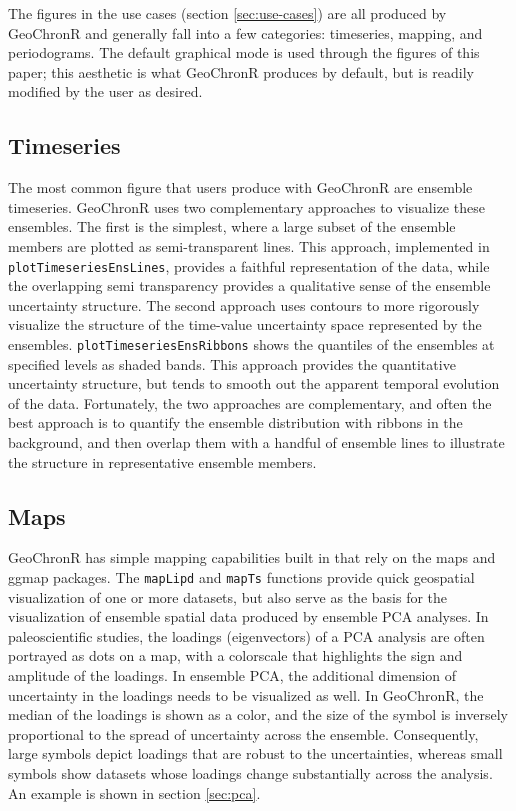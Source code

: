 \documentclass[gchron, manuscript]{copernicus}
\begin{document}
The figures in the use cases (section \ref{sec:use-cases}) are all produced by GeoChronR and generally fall into a few categories: timeseries, mapping, and periodograms.
The default graphical mode is used through the figures of this paper; this aesthetic is what GeoChronR produces by default, but is readily modified by the user as desired.

\subsection{Timeseries}

The most common figure that users produce with GeoChronR are ensemble timeseries.
GeoChronR uses two complementary approaches to visualize these ensembles.
The first is the simplest, where a large subset of the ensemble members are plotted as semi-transparent lines.
This approach, implemented in \texttt{plotTimeseriesEnsLines}, provides a faithful representation of the data, while the overlapping semi transparency provides a qualitative sense of the ensemble uncertainty structure.
The second approach uses contours to more rigorously visualize the structure of the time-value uncertainty space represented by the ensembles.
\texttt{plotTimeseriesEnsRibbons} shows the quantiles of the ensembles at specified levels as shaded bands.
This approach provides the quantitative uncertainty structure, but tends to smooth out the apparent temporal evolution of the data.
Fortunately, the two approaches are complementary, and often the best approach is to quantify the ensemble distribution with ribbons in the background, and then overlap them with a handful of ensemble lines to illustrate the structure in representative ensemble members.

\subsection{Maps}

GeoChronR has simple mapping capabilities built in that rely on the maps \citep{maps} and ggmap \citep{ggmap} packages.
The \texttt{mapLipd} and \texttt{mapTs} functions provide quick geospatial visualization of one or more datasets, but also serve as the basis for the visualization of ensemble spatial data produced by ensemble PCA analyses.
In paleoscientific studies, the loadings (eigenvectors) of a PCA analysis are often portrayed as dots on a map, with a colorscale that highlights the sign and amplitude of the loadings.
In ensemble PCA, the additional dimension of uncertainty in the loadings needs to be visualized as well.
In GeoChronR, the median of the loadings is shown as a color, and the size of the symbol is inversely proportional to the spread of uncertainty across the ensemble.
Consequently, large symbols depict loadings that are robust to the uncertainties, whereas small symbols show datasets whose loadings change substantially across the analysis.
An example is shown in section \ref{sec:pca}.
\end{document}
